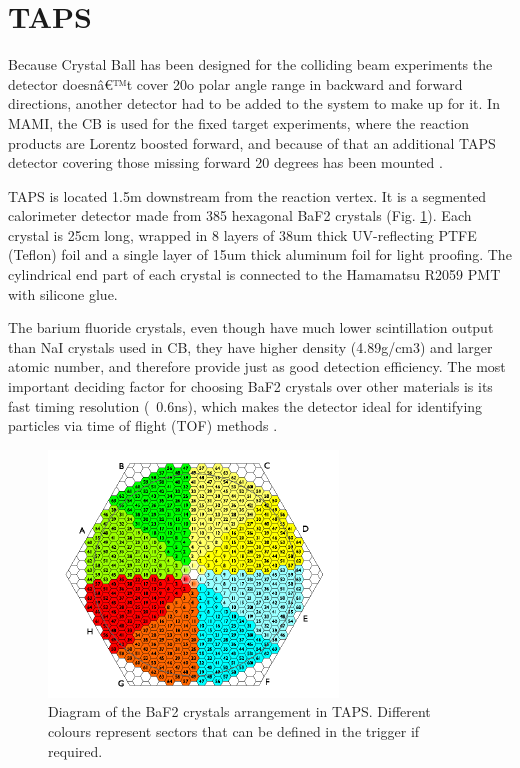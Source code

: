 \section{TAPS}

\indent Because Crystal Ball has been designed for the colliding beam experiments the detector  doesnâ€™t  cover  20o  polar  angle  range  in  backward  and  forward directions, another detector had to be added to the system to make up for it. In MAMI,  the  CB  is  used  for  the  fixed  target  experiments,  where  the  reaction products are Lorentz boosted forward, and because of that an additional TAPS detector  covering  those  missing  forward  20  degrees has  been  mounted \cite{novotny}.

\indent TAPS is located 1.5m downstream from the reaction vertex. It is a segmented calorimeter detector made from 385 hexagonal BaF2 crystals (Fig. \ref{taps}). Each crystal is  25cm long,  wrapped in  8  layers  of 38um thick  UV-reflecting PTFE (Teflon) foil and a single layer of 15um thick aluminum foil for light proofing. The cylindrical end part of each crystal is connected to the Hamamatsu R2059 PMT with silicone glue.

\indent The barium fluoride crystals, even though have much lower scintillation output than NaI crystals used in CB, they have higher density (4.89g/cm3) and larger atomic number, and therefore provide just as good detection efficiency. The most important deciding factor for choosing BaF2 crystals over other materials is its fast timing resolution (~0.6ns), which makes the detector ideal for identifying particles via time of flight (TOF) methods \cite{novotny}.


\begin{figure}[H]
\begin{center}
\includegraphics[scale=1.4]{taps.png}
\caption{Diagram of the BaF2 crystals arrangement in TAPS. Different colours represent sectors that can be defined in the trigger if required.}
\label{taps}
\end{center}
\end{figure} 

